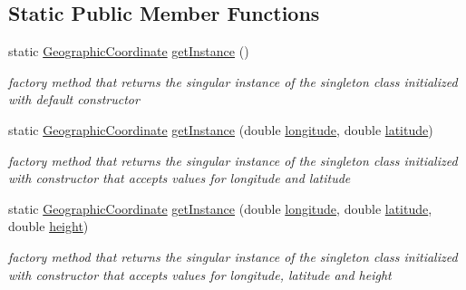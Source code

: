 \subsection*{Static Public Member Functions}
\begin{DoxyCompactItemize}
\item 
static \hyperlink{classcoordinates_1_1_geographic_coordinate}{Geographic\+Coordinate} \hyperlink{classcoordinates_1_1_geographic_coordinate_a16664e43964dee1be65e978904315266}{get\+Instance} ()
\begin{DoxyCompactList}\small\item\em factory method that returns the singular instance of the singleton class initialized with default constructor \end{DoxyCompactList}\item 
static \hyperlink{classcoordinates_1_1_geographic_coordinate}{Geographic\+Coordinate} \hyperlink{classcoordinates_1_1_geographic_coordinate_a29ced8017420b012f7bd5749ed6ba600}{get\+Instance} (double \hyperlink{classcoordinates_1_1_geographic_coordinate_a1ffbbfc5c01ab766af1d32bcc8cb42ad}{longitude}, double \hyperlink{classcoordinates_1_1_geographic_coordinate_a07a18abcc3cd691d4d8821a875dabbd6}{latitude})
\begin{DoxyCompactList}\small\item\em factory method that returns the singular instance of the singleton class initialized with constructor that accepts values for longitude and latitude \end{DoxyCompactList}\item 
static \hyperlink{classcoordinates_1_1_geographic_coordinate}{Geographic\+Coordinate} \hyperlink{classcoordinates_1_1_geographic_coordinate_afa986233325df2fb8a8b47d4ddeaee46}{get\+Instance} (double \hyperlink{classcoordinates_1_1_geographic_coordinate_a1ffbbfc5c01ab766af1d32bcc8cb42ad}{longitude}, double \hyperlink{classcoordinates_1_1_geographic_coordinate_a07a18abcc3cd691d4d8821a875dabbd6}{latitude}, double \hyperlink{classcoordinates_1_1_geographic_coordinate_a928334b65b117d99cd724d2c0b9b7ee0}{height})
\begin{DoxyCompactList}\small\item\em factory method that returns the singular instance of the singleton class initialized with constructor that accepts values for longitude, latitude and height \end{DoxyCompactList}\end{DoxyCompactItemize}
